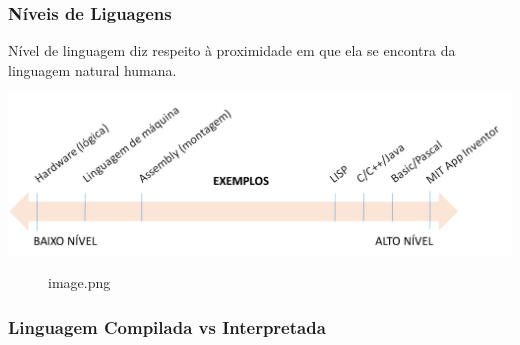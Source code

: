 \documentclass[12pt,a4paper]{article}
\begin{document}
    \hypertarget{nuxedveis-de-liguagens}{%
\subsubsection{Níveis de Liguagens}\label{nuxedveis-de-liguagens}}

    Nível de linguagem diz respeito à proximidade em que ela se encontra da
linguagem natural humana.

\includegraphics{"figs/image03.png"}

    \begin{figure}
\centering
\caption{image.png}
\end{figure}

    \hypertarget{linguagem-compilada-vs-interpretada}{%
\subsubsection{Linguagem Compilada vs
Interpretada}\label{linguagem-compilada-vs-interpretada}}
\end{document}

